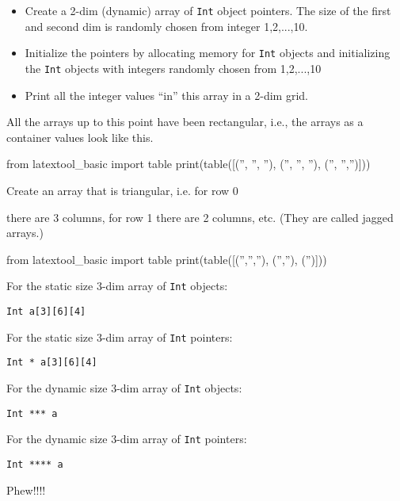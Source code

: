 \begin{ex}

\begin{itemize}
\item
  Create a 2-dim (dynamic) array of \texttt{Int} object pointers. The size
  of the first and second dim is randomly chosen from integer
  1,2,...,10.
\item
  Initialize the pointers by allocating memory for \texttt{Int} objects
  and initializing the \texttt{Int} objects with integers randomly chosen
  from 1,2,...,10
\item
  Print all the integer values ``in'' this array in a 2-dim grid.
\end{itemize}

All the arrays up to this point have been rectangular, i.e., the arrays
as a container values look like this.
\begin{python}
from latextool_basic import table
print(table([('', '', ''), ('', '', ''), ('', '','')]))
\end{python}
Create an array that is triangular, i.e. for row 0

there are 3 columns, for row 1 there are 2 columns, etc. (They are
called jagged arrays.)
\begin{python}
from latextool_basic import table
print(table([('','',''), ('',''), ('')]))
\end{python}
For the static size 3-dim array of \texttt{Int} objects:
\begin{center}
\texttt{Int a[3][6][4]}
\end{center}
For the static size 3-dim array of \texttt{Int} pointers:
\begin{center}
\texttt{Int * a[3][6][4]}
\end{center}
For the dynamic size 3-dim array of \texttt{Int} objects:
\begin{center}
\texttt{Int *** a}
\end{center}
For the dynamic size 3-dim array of \texttt{Int} pointers:
\begin{center}
\texttt{Int **** a}
\end{center}
Phew!!!!
\end{ex}

